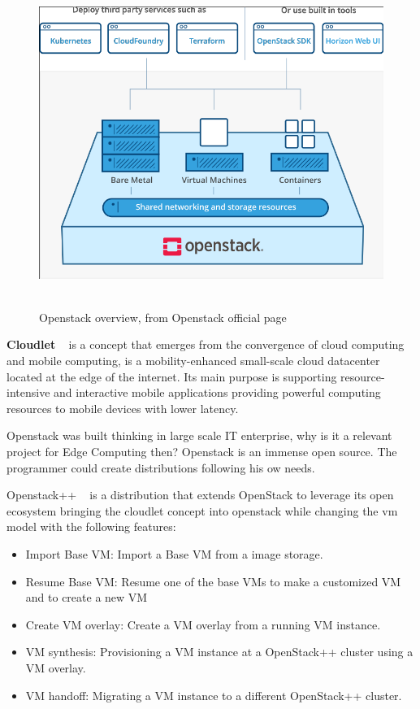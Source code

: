 \begin{figure}[h]%
    \includegraphics[width=6.0in]{figures/openstack.png}
~\caption{Openstack overview, from Openstack official page}
\label{figure2.2}
\end{figure}

\newpage

\textbf{Cloudlet} ~\cite{cloudlet_def} is a concept that emerges from the convergence of cloud computing and mobile computing, is a mobility-enhanced small-scale cloud datacenter located at the edge of the internet. Its main purpose is supporting resource-intensive and interactive mobile applications providing powerful computing resources to mobile devices with lower latency.

Openstack was built thinking in large scale IT enterprise, why is it a relevant project for Edge Computing then? Openstack is an immense open source. The programmer could create distributions following his ow needs.

Openstack++ ~\cite{Cloudlet:2015} is a distribution that extends OpenStack to leverage its open ecosystem bringing the cloudlet concept into openstack while changing the vm model with the following features:

\begin{itemize}
    \item Import Base VM: Import a Base VM from a image storage.
    \item Resume Base VM: Resume one of the base VMs to make a customized VM and to create a new VM
    \item Create VM overlay: Create a VM overlay from a running VM instance.
    \item VM synthesis: Provisioning a VM instance at a OpenStack++ cluster using a VM overlay.
    \item VM handoff: Migrating a VM instance to a different OpenStack++ cluster.
\end{itemize}

